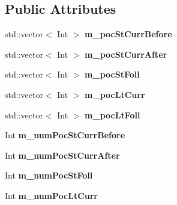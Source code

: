 \subsection*{Public Attributes}
\begin{DoxyCompactItemize}
\item 
\mbox{\label{class_t_com_decoded_rps_ae84d61b600be1abf7a38cc6583a86f21}} 
std\+::vector$<$ Int $>$ {\bfseries m\+\_\+poc\+St\+Curr\+Before}
\item 
\mbox{\label{class_t_com_decoded_rps_acc0092de12c837996c2df0231ec23438}} 
std\+::vector$<$ Int $>$ {\bfseries m\+\_\+poc\+St\+Curr\+After}
\item 
\mbox{\label{class_t_com_decoded_rps_a6e11219d9d20447155c2f2055fb27423}} 
std\+::vector$<$ Int $>$ {\bfseries m\+\_\+poc\+St\+Foll}
\item 
\mbox{\label{class_t_com_decoded_rps_af56e3d933588db4f20fcc31810aaab39}} 
std\+::vector$<$ Int $>$ {\bfseries m\+\_\+poc\+Lt\+Curr}
\item 
\mbox{\label{class_t_com_decoded_rps_ac36435113d1a0448fc264ac8fa6ee31b}} 
std\+::vector$<$ Int $>$ {\bfseries m\+\_\+poc\+Lt\+Foll}
\item 
\mbox{\label{class_t_com_decoded_rps_a7f2588d847826a0a12a8669bab27fb94}} 
Int {\bfseries m\+\_\+num\+Poc\+St\+Curr\+Before}
\item 
\mbox{\label{class_t_com_decoded_rps_a4b018826c2abeef318746711c7212743}} 
Int {\bfseries m\+\_\+num\+Poc\+St\+Curr\+After}
\item 
\mbox{\label{class_t_com_decoded_rps_a87e7c14b95aed45682ed1270b522ac5e}} 
Int {\bfseries m\+\_\+num\+Poc\+St\+Foll}
\item 
\mbox{\label{class_t_com_decoded_rps_a204536934771842edd84eff2ea615f0d}} 
Int {\bfseries m\+\_\+num\+Poc\+Lt\+Curr}
\item 
\mbox{\label{class_t_com_decoded_rps_aa0f9e56e700894e974cce5f046a32650}} 

\end{DoxyCompactItemize}
